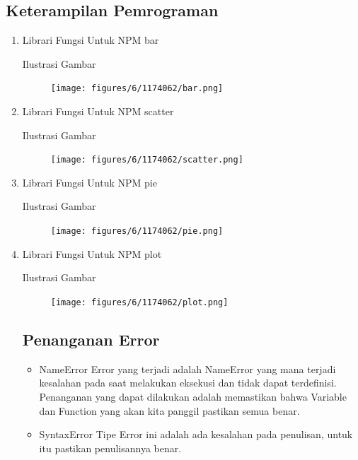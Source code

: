 \subsection{Keterampilan Pemrograman}
\begin{enumerate}

\item Librari Fungsi Untuk NPM bar 

Ilustrasi Gambar
	\begin{figure}[ht!]
	\texttt{[image: figures/6/1174062/bar.png]}
	\centering
	\end{figure}

\item Librari Fungsi Untuk NPM scatter

Ilustrasi Gambar
	\begin{figure}[ht!]
	\texttt{[image: figures/6/1174062/scatter.png]}
	\centering
	\end{figure}

\item Librari Fungsi Untuk NPM pie

Ilustrasi Gambar
	\begin{figure}[ht!]
	\texttt{[image: figures/6/1174062/pie.png]}
	\centering
	\end{figure}

\item Librari Fungsi Untuk NPM plot

Ilustrasi Gambar
	\begin{figure}[ht!]
	\texttt{[image: figures/6/1174062/plot.png]}
	\centering
	\end{figure}

\subsection{Penanganan Error}

\begin{itemize}

\item NameError
Error yang terjadi adalah NameError yang mana terjadi kesalahan pada saat melakukan eksekusi dan tidak dapat terdefinisi.
Penanganan yang dapat dilakukan adalah memastikan bahwa Variable dan Function yang akan kita panggil pastikan semua benar.\\

\item SyntaxError
Tipe Error ini adalah ada kesalahan pada penulisan, untuk itu pastikan penulisannya benar.\\


\end{itemize}
\end{enumerate}
